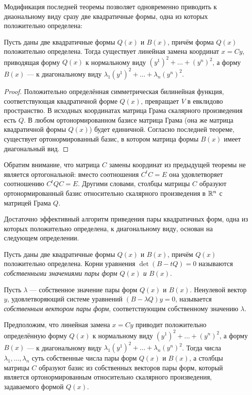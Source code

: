Модификация последней теоремы позволяет одновременно приводить к диаональному виду сразу две квадратичные формы, одна из которых положительно определена:

\begin{theorem}
    Пусть даны две квадратичные формы $Q(x)$ и $B(x)$, причём форма $Q(x)$ положительно определена. Тогда существует линейная замена координат $x = Cy$, приводящая форму $Q(x)$ к нормальному виду $(y^1)^2 + \ldots + (y^n)^2$, а форму $B(x)$ --- к диагональному виду $\lambda_1(y^1)^2 + \ldots + \lambda_n(y^n)^2$.
\end{theorem}

\begin{proof}
    Положительно определённая симметрическая билинейная функция, соответствующая квадратичной форме $Q(x)$, превращает $V$ в евклидово пространство. В исходных координатах матрица Грама скалярного произведения есть $Q$. В любом ортонормированном базисе матрица Грама (она же матрица квадратичной формы $Q(x)$) будет единичной. Согласно последней теореме, существует ортонормированный базис, в котором матрица формы $B(x)$ имеет диагональный вид.
\end{proof}

Обратим внимание, что матрица $C$ замены координат из предыдущей теоремы не является ортогональной: вместо соотношения $C^tC = E$ она удовлетворяет соотношению $C^tQC = E$. Другими словами, столбцы матрицы $C$ образуют ортонормированный базис относительно скалярного произведения в $\mathbb{R}^n$ с матрицей Грама $Q$.

Достаточно эффективный алгоритм приведения пары квадратичных форм, одна из которых положительно определена, к диагональному виду, основан на следующем определении.

\begin{definition}
    Пусть даны две квадратичные формы $Q(x)$ и $B(x)$, причём $Q(x)$ положительно определена. Корни уравнения $\det(B - tQ) = 0$ называются \textit{собственными значениями пары форм $Q(x)$ и $B(x)$}.
\end{definition}

Пусть $\lambda$ --- собственное значение пары форм $Q(x)$ и $B(x)$. Ненулевой вектор $y$, удовлетворяющий системе уравнений $(B - \lambda Q)y = 0$, называется \textit{собственным вектором пары форм}, соответствующим собственному значению $\lambda$.

\begin{theorem}
    Предположим, что линейная замена $x = Cy$ приводит положительно определённую форму $Q(x)$ к нормальному виду $(y^1)^2 + \ldots + (y^n)^2$, а форму $B(x)$ --- к диагональному виду $\lambda_1(y^1)^2 + \ldots + \lambda_n(y^n)^2$. Тогда числа $\lambda_1, \ldots, \lambda_n$ суть собственные числа пары форм $Q(x)$ и $B(x)$, а столбцы матрицы $C$ образуют базис из собственных векторов пары форм, который является ортонормированным относительно скалярного произведения, задаваемого формой $Q(x)$.
\end{theorem}

